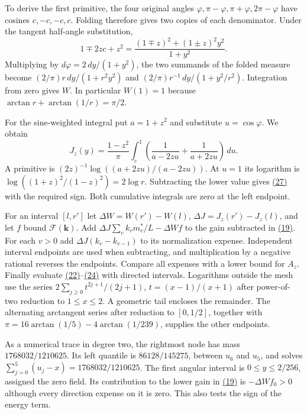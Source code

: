 \documentclass[11pt,a4paper]{article}
\begin{document}
To derive the first primitive, the four original angles \(\varphi,\pi-\varphi,\pi+\varphi,2\pi-\varphi\) have cosines \(c,-c,-c,c\). Folding therefore gives two copies of each denominator. Under the tangent half-angle substitution, \[
 1\mp2zc+z^2=\frac{(1\mp z)^2+(1\pm z)^2y^2}{1+y^2}.
\] Multiplying by \(d\varphi=2\,dy/(1+y^2)\), the two summands of the folded measure become \((2/\pi)r\,dy/(1+r^2y^2)\) and \((2/\pi)r^{-1}\,dy/(1+y^2/r^2)\). Integration from zero gives \(W\). In particular \(W(1)=1\) because \(\arctan r+\arctan(1/r)=\pi/2\).

For the sine-weighted integral put \(a=1+z^2\) and substitute \(u=\cos\varphi\). We obtain \[
 J_z(y)=\frac{1-z^2}{\pi}\int_c^1
 \left(\frac1{a-2zu}+\frac1{a+2zu}\right)\,du .
\] A primitive is \((2z)^{-1}\log((a+2zu)/(a-2zu))\). At \(u=1\) its logarithm is \(\log((1+z)^2/(1-z)^2)=2\log r\). Subtracting the lower value gives \hyperref[eq:27]{(27)} with the required sign. Both cumulative integrals are zero at the left endpoint.

For an interval \([l,r']\) let \(\Delta W=W(r')-W(l)\), \(\Delta J=J_z(r')-J_z(l)\), and let \(f\) bound \(\mathcal F(\mathbf k)\). Add \(\Delta J\sum_v k_vm_v^*/L-\Delta W f\) to the gain subtracted in \hyperref[eq:19]{(19)}. For each \(v>0\) add \(\Delta J(k_v-k_{v-1})\) to its normalization expense. Independent interval endpoints are used when subtracting, and multiplication by a negative rational reverses the endpoints. Compare all expenses with a lower bound for \(A_z\). Finally evaluate \hyperref[eq:22]{(22)}--\hyperref[eq:24]{(24)} with directed intervals. Logarithms outside the mesh use the series \(2\sum_{j\ge0}t^{2j+1}/(2j+1)\), \(t=(x-1)/(x+1)\) after power-of-two reduction to \(1\le x\le2\). A geometric tail encloses the remainder. The alternating arctangent series after reduction to \([0,1/2]\), together with \(\pi=16\arctan(1/5)-4\arctan(1/239)\), supplies the other endpoints.

As a numerical trace in degree two, the rightmost node has mass \(1768032/1210625\). Its left quantile is \(86128/145275\), between \(u_6\) and \(u_5\), and solves \(\sum_{j=0}^5(u_j-x)=1768032/1210625\). The first angular interval is \(0\le y\le2/256\), assigned the zero field. Its contribution to the lower gain in \hyperref[eq:19]{(19)} is \(-\Delta W f_0>0\) although every direction expense on it is zero. This also tests the sign of the energy term.
\end{document}
